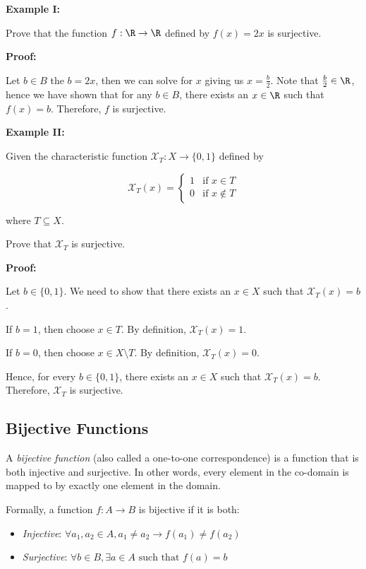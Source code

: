 \textbf{Example I:}

Prove that the function \(f: \R \to \R\) defined by \(f(x) = 2x\) is surjective.

\textbf{Proof:}

Let \(b \in B\) the \(b = 2x\), then we can solve for \(x\) giving us \(x = \frac{b}{2}\). Note that \(\frac{b}{2} \in \R\), hence 
we have shown that for any \(b \in B\), there exists an \(x \in \R\) such that \(f(x) = b\). Therefore, \(f\) is surjective.

\QED

\textbf{Example II:}

Given the characteristic function \(\mathcal{X}_T: X \to \{0,1\}\) defined by

\[
	\mathcal{X}_T(x) = 
	\begin{cases}
		1 & \text{if } x \in T \\
		0 & \text{if } x \notin T
	\end{cases}
\]

where \(T \subseteq X\).

Prove that \(\mathcal{X}_T\) is surjective. 

\textbf{Proof:}

Let \(b \in \{0,1\}\). We need to show that there exists an \(x \in X\) such that \(\mathcal{X}_T(x) = b\).

If \(b = 1\), then choose \(x \in T\). By definition, \(\mathcal{X}_T(x) = 1\).

If \(b = 0\), then choose \(x \in X \setminus T\). By definition, \(\mathcal{X}_T(x) = 0\).

Hence, for every \(b \in \{0,1\}\), there exists an \(x \in X\) such that \(\mathcal{X}_T(x) = b\). Therefore, \(\mathcal{X}_T\) is surjective.

\QED

\subsection{Bijective Functions}

A \emph{bijective function} (also called a one-to-one correspondence) is a function that is both injective and surjective. In other words, every 
element in the co-domain is mapped to by exactly one element in the domain.

Formally, a function \(f: A \to B\) is bijective if it is both:

\begin{itemize}

	\item \emph{Injective}: \(\forall a_1, a_2 \in A, a_1 \neq a_2 \to f(a_1) \neq f(a_2)\)

	\item \emph{Surjective}: \(\forall b \in B, \exists a \in A \text{ such that } f(a) = b\)

\end{itemize}

